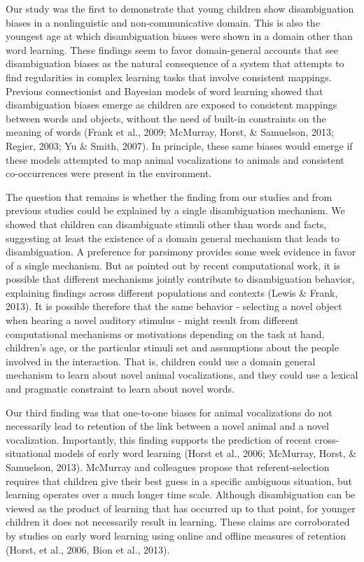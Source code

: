 \documentclass[english,floatsintext,man]{apa6}
\theoremstyle{definition}
\theoremstyle{definition}
\theoremstyle{definition}
\theoremstyle{remark}
\begin{document}
Our study was the first to demonstrate that young children show
disambiguation biases in a nonlinguistic and non-communicative domain.
This is also the youngest age at which disambiguation biases were shown
in a domain other than word learning. These findings seem to favor
domain-general accounts that see disambiguation biases as the natural
consequence of a system that attempts to find regularities in complex
learning tasks that involve consistent mappings. Previous connectionist
and Bayesian models of word learning showed that disambiguation biases
emerge as children are exposed to consistent mappings between words and
objects, without the need of built-in constraints on the meaning of
words (Frank et al., 2009; McMurray, Horst, \& Samuelson, 2013; Regier,
2003; Yu \& Smith, 2007). In principle, these same biases would emerge
if these models attempted to map animal vocalizations to animals and
consistent co-occurrences were present in the environment.

The question that remains is whether the finding from our studies and
from previous studies could be explained by a single disambiguation
mechanism. We showed that children can disambiguate stimuli other than
words and facts, suggesting at least the existence of a domain general
mechanism that leads to disambiguation. A preference for parsimony
provides some week evidence in favor of a single mechanism. But as
pointed out by recent computational work, it is possible that different
mechanisms jointly contribute to disambiguation behavior, explaining
findings across different populations and contexts (Lewis \& Frank,
2013). It is possible therefore that the same behavior - selecting a
novel object when hearing a novel auditory stimulus - might result from
different computational mechanisms or motivations depending on the task
at hand, children's age, or the particular stimuli set and assumptions
about the people involved in the interaction. That is, children could
use a domain general mechanism to learn about novel animal
vocalizations, and they could use a lexical and pragmatic constraint to
learn about novel words.

Our third finding was that one-to-one biases for animal vocalizations do
not necessarily lead to retention of the link between a novel animal and
a novel vocalization. Importantly, this finding supports the prediction
of recent cross-situational models of early word learning (Horst et al.,
2006; McMurray, Horst, \& Samuelson, 2013). McMurray and colleagues
propose that referent-selection requires that children give their best
guess in a specific ambiguous situation, but learning operates over a
much longer time scale. Although disambiguation can be viewed as the
product of learning that has occurred up to that point, for younger
children it does not necessarily result in learning. These claims are
corroborated by studies on early word learning using online and offline
measures of retention (Horst, et al., 2006, Bion et al., 2013).
\end{document}
